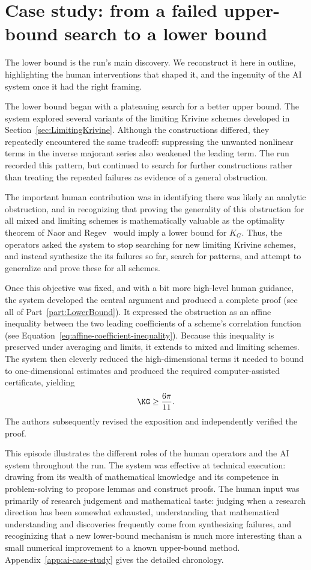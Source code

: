 \section{Case study: from a failed upper-bound search to a lower bound}
\label{sec:ai-lower-bound-case-study}

The lower bound is the run's main discovery. We reconstruct it here in
outline, highlighting the human interventions that shaped it, and the ingenuity of the AI system once it had the right framing.

The lower bound began with a plateauing search for a better upper bound. The system explored several variants of the limiting Krivine schemes developed in Section~\ref{sec:LimitingKrivine}. Although the constructions differed, they repeatedly encountered
the same tradeoff: suppressing the unwanted nonlinear terms in the inverse majorant series also weakened
the leading term. The run recorded this pattern, but continued to search
for further constructions rather than treating the repeated failures as
evidence of a general obstruction.

The important human contribution was in identifying there was likely an analytic obstruction, and in recognizing that proving the generality of this obstruction for all mixed and limiting schemes is mathematically valuable as the optimality theorem of Naor and Regev~\cite{naor2014krivine} would imply a lower bound for $K_G$. Thus, the operators asked the system to stop searching for new limiting Krivine schemes, and instead synthesize the its failures so far, search for patterns, and attempt to generalize and prove these for all schemes.

Once this objective was fixed, and with a bit more high-level human guidance, the system developed the central argument
and produced a complete proof (see all of Part~\ref{part:LowerBound}). It expressed the obstruction as an
affine inequality between the two leading coefficients of a scheme's
correlation function (see Equation~\ref{eq:affine-coefficient-inequality}). Because this inequality is preserved under averaging
and limits, it extends to mixed and limiting schemes. The system then
cleverly reduced the high-dimensional terms it needed to bound to one-dimensional estimates and produced
the required computer-assisted certificate, yielding
\[
    \KG \geq \frac{6\pi}{11}.
\]
The authors subsequently revised the exposition and independently verified
the proof.

This episode illustrates the different roles of the human operators and the AI system throughout the run. The system was effective at technical execution: drawing from its wealth of mathematical knowledge and its competence in problem-solving to propose lemmas and construct proofs. The human input was primarily of research judgement and mathematical taste: judging when a research direction has been somewhat exhausted, understanding that mathematical understanding and discoveries frequently come from synthesizing failures, 
and recoginizing that a new lower-bound mechanism is much more interesting than a small numerical improvement to a
known upper-bound method. Appendix~\ref{app:ai-case-study} gives the
detailed chronology.



